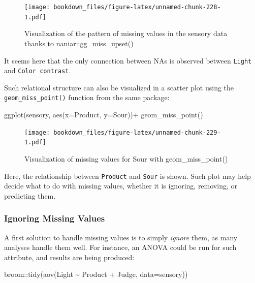 \documentclass[
]{krantz}
\makeatletter
\newenvironment{Shaded}{\begin{snugshade}}{\end{snugshade}}
\newcommand{\AttributeTok}[1]{\textcolor[rgb]{0.61,0.61,0.61}{#1}}
\newcommand{\FunctionTok}[1]{\textcolor[rgb]{0,0,0}{#1}}
\newcommand{\NormalTok}[1]{#1}
\newcommand{\SpecialCharTok}[1]{\textcolor[rgb]{0,0,0}{#1}}
\newenvironment{kframe}{%
\medskip{}
\setlength{\fboxsep}{.8em}
 \def\at@end@of@kframe{}%
 \ifinner\ifhmode%
  \def\at@end@of@kframe{\end{minipage}}%
  \begin{minipage}{\columnwidth}%
 \fi\fi%
 \def\FrameCommand##1{\hskip\@totalleftmargin \hskip-\fboxsep
 \colorbox{shadecolor}{##1}\hskip-\fboxsep
     \hskip-\linewidth \hskip-\@totalleftmargin \hskip\columnwidth}%
 \MakeFramed {\advance\hsize-\width
   \@totalleftmargin\z@ \linewidth\hsize
   \@setminipage}}%
 {\par\unskip\endMakeFramed%
 \at@end@of@kframe}
\renewenvironment{Shaded}{\begin{kframe}}{\end{kframe}}
\makeatother
\begin{document}
\begin{figure}
\centering
\texttt{[image: bookdown\_files/figure-latex/unnamed-chunk-228-1.pdf]}
\caption{\label{fig:unnamed-chunk-228}Visualization of the pattern of missing values in the sensory data thanks to naniar::gg\_miss\_upset()}
\end{figure}

It seems here that the only connection between NAs is observed between \texttt{Light} and \texttt{Color\ contrast}.

Such relational structure can also be visualized in a scatter plot using the \texttt{geom\_miss\_point()} function from the same package:

\begin{Shaded}
\begin{Highlighting}[]
\FunctionTok{ggplot}\NormalTok{(sensory, }\FunctionTok{aes}\NormalTok{(}\AttributeTok{x=}\NormalTok{Product, }\AttributeTok{y=}\NormalTok{Sour))}\SpecialCharTok{+}
  \FunctionTok{geom\_miss\_point}\NormalTok{()}
\end{Highlighting}
\end{Shaded}

\begin{figure}
\centering
\texttt{[image: bookdown\_files/figure-latex/unnamed-chunk-229-1.pdf]}
\caption{\label{fig:unnamed-chunk-229}Visualization of missing values for Sour with geom\_miss\_point()}
\end{figure}

Here, the relationship between \texttt{Product} and \texttt{Sour} is shown. Such plot may help decide what to do with missing values, whether it is ignoring, removing, or predicting them.

\hypertarget{ignoring-missing-values}{%
\subsubsection*{Ignoring Missing Values}\label{ignoring-missing-values}}


A first solution to handle missing values is to simply \emph{ignore} them, as many analyses handle them well. For instance, an ANOVA could be run for such attribute, and results are being produced:

\begin{Shaded}
\begin{Highlighting}[]
\NormalTok{broom}\SpecialCharTok{::}\FunctionTok{tidy}\NormalTok{(}\FunctionTok{aov}\NormalTok{(Light }\SpecialCharTok{\textasciitilde{}}\NormalTok{ Product }\SpecialCharTok{+}\NormalTok{ Judge, }\AttributeTok{data=}\NormalTok{sensory))}
\end{Highlighting}
\end{Shaded}
\end{document}
